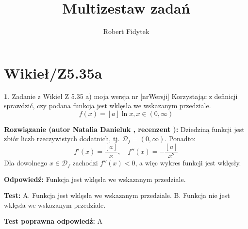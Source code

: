 \documentclass[12pt, a4paper]{article}
\title{Multizestaw zadań}
\author{Robert Fidytek}
\date{}
\theoremstyle{definition} %
\newtheorem{zad}{}
\newcommand{\kategoria}[1]{\section{#1}} %
\newcommand{\zadStart}[1]{\begin{zad}#1\newline} %
\newcommand{\zadStop}{\end{zad}}   %
\newcommand{\rozwStart}[2]{\noindent \textbf{Rozwiązanie (autor #1 , recenzent #2): }\newline} %
\newcommand{\rozwStop}{\newline}                                            %
\newcommand{\odpStart}{\noindent \textbf{Odpowiedź:}\newline}    %
\newcommand{\odpStop}{\newline}                                             %
\newcommand{\testStart}{\noindent \textbf{Test:}\newline} %
\newcommand{\testStop}{\newline} %
\newcommand{\kluczStart}{\noindent \textbf{Test poprawna odpowiedź:}\newline} %
\newcommand{\kluczStop}{\newline} %
\begin{document}
\maketitle

\kategoria{Wikieł/Z5.35a}

\zadStart{Zadanie z Wikieł Z 5.35 a) moja wersja nr [nrWersji]}
Korzystając z definicji sprawdzić, czy podana funkcja jest wklęsła we wskazanym przedziale.
$$f(x) = [a]\ln x, x \in (0,\infty)$$
\zadStop

\rozwStart{Natalia Danieluk}{}
Dziedziną funkcji jest zbiór liczb rzeczywistych dodatnich, tj. $\mathcal{D}_f=(0,\infty)$. Ponadto:
$$f'(x) = \frac{[a]}{x},\quad f''(x) = -\frac{[a]}{x^2}$$
Dla dowolnego $x \in \mathcal{D}_f$ zachodzi $f''(x) < 0$, a więc wykres funkcji jest wklęsły.
\rozwStop

\odpStart
Funkcja jest wklęsła we wskazanym przedziale.
\odpStop

\testStart
A. Funkcja jest wklęsła we wskazanym przedziale.
B. Funkcja nie jest wklęsła we wskazanym przedziale.
\testStop

\kluczStart
A
\kluczStop
\end{document}
